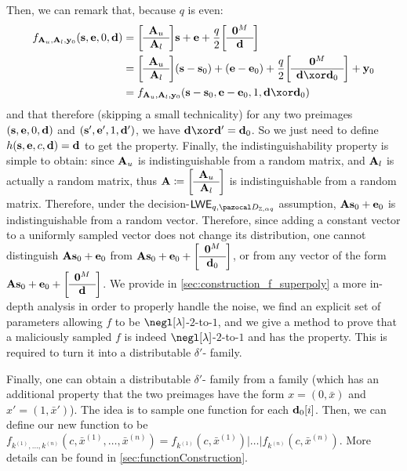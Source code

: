 Then, we can remark that, because $q$ is even:
\begin{align}
  f_{\vect{A}_u,\vect{A}_l,\vect{y}_0}(\vect{s},\vect{e},0,\vect{d})
  &= \SmallBlockMatrix{\vect{A}_u}{\vect{A}_l} \vect{s} + \vect{e} +\frac{q}{2} \SmallBlockMatrix{\vect{0}^M}{\vect{d}}\\
  &= \SmallBlockMatrix{\vect{A}_u}{\vect{A}_l} (\vect{s}-\vect{s}_0) + (\vect{e}-\vect{e}_0) +\frac{q}{2} \SmallBlockMatrix{\vect{0}^M}{\vect{d} \xor \vect{d}_0} + \vect{y}_0\\
  &= f_{\vect{A}_u,\vect{A}_l,\vect{y}_0}(\vect{s}-\vect{s}_0,\vect{e}-\vect{e}_0,1,\vect{d} \xor \vect{d}_0)
\end{align}
and that therefore (skipping a small technicality) for any two preimages $(\mathbf{s},\mathbf{e},0,\mathbf{d})$ and $(\mathbf{s}',\mathbf{e}',1,\mathbf{d}')$, we have $\vect{d} \xor \vect{d}' = \vect{d}_0$. So we just need to define $h(\mathbf{s},\mathbf{e},c,\mathbf{d}) = \mathbf{d}$ to get the \XOR{} property. Finally, the indistinguishability property is simple to obtain: since $\mathbf{A}_u$ is indistinguishable from a random matrix, and $\mathbf{A}_l$ is actually a random matrix, thus $\vect{A} \eqdef \SmallBlockMatrix{\vect{A}_u}{\vect{A}_l}$ is  indistinguishable from a random matrix. Therefore, under the decision-$\LWE{}_{q,\cD_{\Z, \alpha q}}$ assumption, $\mathbf{A} \mathbf{s}_0 + \mathbf{e}_0$ is indistinguishable from a random vector. Therefore, since adding a constant vector to a uniformly sampled vector does not change its distribution, one cannot distinguish $\mathbf{A} \mathbf{s}_0 + \mathbf{e}_0$ from $\vect{A} \vect{s}_0 + \vect{e}_0 + \SmallBlockMatrix{\vect{0}^M}{\vect{d}_0}$, or from any vector of the form $\vect{A} \vect{s}_0 + \vect{e}_0 + \SmallBlockMatrix{\vect{0}^M}{\vect{d}}$. We provide in \cref{sec:construction_f_superpoly} a more in-depth analysis in order to properly handle the noise, we find an explicit set of parameters allowing $f$ to be $\negl[\lambda]$-$2$-to-$1$, and we give a method to prove that a maliciously sampled $f$ is indeed $\negl[\lambda]$-$2$-to-$1$ and has the \XOR{} property. This is required to turn it into a distributable $\delta'$-\AssumpFctCanNoDelta{} family.

Finally, one can obtain a distributable $\delta'$-\AssumpFctCanNoDelta{} family from a \AssumpFct{} family (which has an additional property that the two preimages have the form $x = (0,\bar{x})$ and $x' = (1, \bar{x}')$). The idea is to sample one \AssumpFct{} function for each $\mathbf{d}_0[i]$. Then, we can define our new function to be $f_{k^{(1)},\dots,k^{(n)}}(c,\bar{x}^{(1)},\dots,\bar{x}^{(n)}) = f_{k^{(1)}}(c,\bar{x}^{(1)}) |\dots | f_{k^{(n)}}(c,\bar{x}^{(n)})$. More details can be found in \cref{sec:functionConstruction}.

